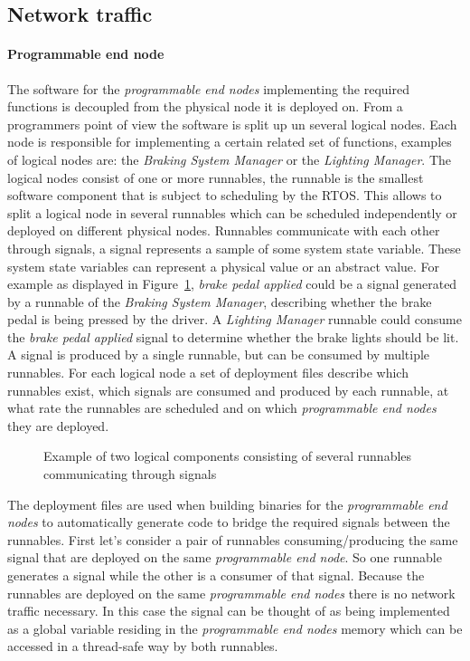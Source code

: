 \subsection{Network traffic}
\label{sec:networktraffic}
\paragraph{Programmable end node}
The software for the \textit{programmable end nodes} implementing the required functions is decoupled from the physical node it is deployed on. From a programmers point of view the software is split up un several logical nodes. Each node is responsible for implementing a certain related set of functions, examples of logical nodes are: the \textit{Braking System Manager} or the \textit{Lighting Manager}. The logical nodes consist of one or more runnables, the runnable is the smallest software component that is subject to scheduling by the RTOS. This allows to split a logical node in several runnables which can be scheduled independently or deployed on different physical nodes. Runnables communicate with each other through signals, a signal represents a sample of some system state variable. These system state variables can represent a physical value or an abstract value. For example as displayed in Figure~\ref{fig:logical}, \textit{brake pedal applied} could be a signal generated by a runnable of the \textit{Braking System Manager}, describing whether the brake pedal is being pressed by the driver. A \textit{Lighting Manager} runnable could consume the \textit{brake pedal applied} signal to determine whether the brake lights should be lit. A signal is produced by a single runnable, but can be consumed by multiple runnables. For each logical node a set of deployment files describe which runnables exist, which signals are consumed and produced by each runnable, at what rate the runnables are scheduled and on which \textit{programmable end nodes} they are deployed.

\begin{figure}[htbp]
    \centering
 \caption{Example of two logical components consisting of several runnables communicating through signals}
\label{fig:logical}
\end{figure}

The deployment files are used when building binaries for the \textit{programmable end nodes} to automatically generate code to bridge the required signals between the runnables. First let's consider a pair of runnables consuming/producing the same signal that are deployed on the same \textit{programmable end node}. So one runnable generates a signal while the other is a consumer of that signal. Because the runnables are deployed on the same \textit{programmable end nodes} there is no network traffic necessary. In this case the signal can be thought of as being implemented as a global variable residing in the \textit{programmable end nodes} memory which can be accessed in a thread-safe way by both runnables.

